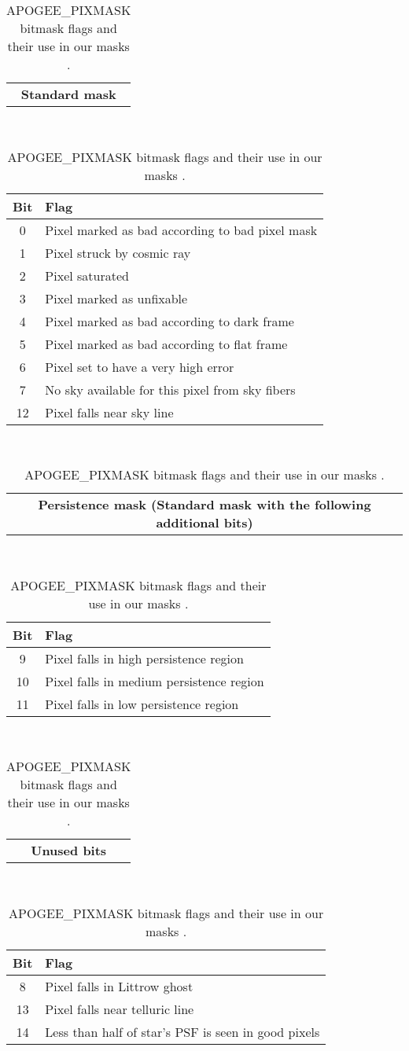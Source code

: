 \documentclass[a4paper,fleqn,usenatbib]{mnras}
\begin{document}
\begin{table}
	\caption{APOGEE\_PIXMASK bitmask flags and their use in our masks \citep{Holtzman2015}.}
	\label{tab:bitmask}
	\begin{tabular}{|c|}
		\textbf{Standard mask}\\
	\end{tabular}
	\\
	\begin{tabular}{|c|l|} 
		\hline
        Bit & Flag  \\
        \hline
        0 & Pixel marked as bad according to bad pixel mask \phantom{here is some ti}\\
        1 & Pixel struck by cosmic ray \\
        2 & Pixel saturated \\
        3 & Pixel marked as unfixable\\
        4 & Pixel marked as bad according to dark frame \\
        5 & Pixel marked as bad according to flat frame \\
        6 & Pixel set to have a very high error\\
        7 & No sky available for this pixel from sky fibers\\
        12 & Pixel falls near sky line \\
        \hline
	\end{tabular}
	\\
	\begin{tabular}{|c|}
		\textbf{Persistence mask (Standard mask with the following additional bits)}\\
	\end{tabular}
	\\
	\begin{tabular}{|c|l|} 
		\hline
        Bit & Flag  \\
        \hline
        9 & Pixel falls in high persistence region \phantom{here is some texty stuff nee}\\
        10 & Pixel falls in medium persistence region \\
        11 & Pixel falls in low persistence region \\
        \hline
    \end{tabular}
    \\
	\begin{tabular}{|c|}
		\textbf{Unused bits}\\
	\end{tabular}
	\\
	\begin{tabular}{|c|l|} 
		\hline
        Bit & Flag  \\
        \hline
        8 & Pixel falls in Littrow ghost \\
        13 & Pixel falls near telluric line \\
        14 & Less than half of star's PSF is seen in good pixels \phantom{here is some t}\\
        \hline
	\end{tabular}
\end{table}
\end{document}

